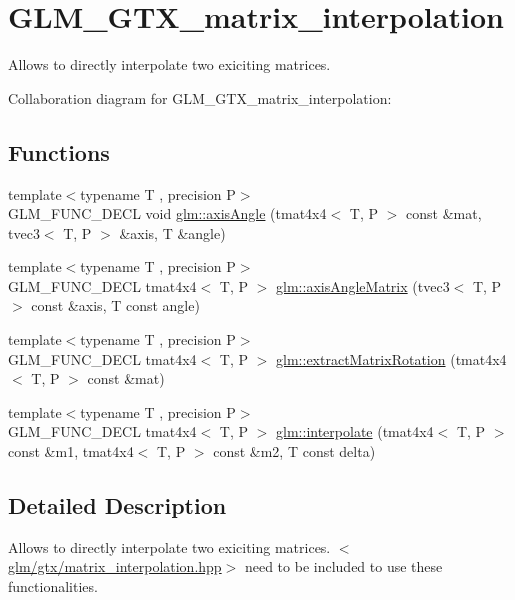 \hypertarget{group__gtx__matrix__interpolation}{\section{G\-L\-M\-\_\-\-G\-T\-X\-\_\-matrix\-\_\-interpolation}
\label{group__gtx__matrix__interpolation}
}


Allows to directly interpolate two exiciting matrices.  


Collaboration diagram for G\-L\-M\-\_\-\-G\-T\-X\-\_\-matrix\-\_\-interpolation\-:
\subsection*{Functions}
\begin{DoxyCompactItemize}
\item 
{\footnotesize template$<$typename T , precision P$>$ }\\G\-L\-M\-\_\-\-F\-U\-N\-C\-\_\-\-D\-E\-C\-L void \hyperlink{group__gtx__matrix__interpolation_ga9aef292eb5f29bdbb58a53ef4281af92}{glm\-::axis\-Angle} (tmat4x4$<$ T, P $>$ const \&mat, tvec3$<$ T, P $>$ \&axis, T \&angle)
\item 
{\footnotesize template$<$typename T , precision P$>$ }\\G\-L\-M\-\_\-\-F\-U\-N\-C\-\_\-\-D\-E\-C\-L tmat4x4$<$ T, P $>$ \hyperlink{group__gtx__matrix__interpolation_ga82d4bc058e9628cb2ea1d4e117a0cf39}{glm\-::axis\-Angle\-Matrix} (tvec3$<$ T, P $>$ const \&axis, T const angle)
\item 
{\footnotesize template$<$typename T , precision P$>$ }\\G\-L\-M\-\_\-\-F\-U\-N\-C\-\_\-\-D\-E\-C\-L tmat4x4$<$ T, P $>$ \hyperlink{group__gtx__matrix__interpolation_ga6b8170aa4cf43caf81400696ebb38afe}{glm\-::extract\-Matrix\-Rotation} (tmat4x4$<$ T, P $>$ const \&mat)
\item 
{\footnotesize template$<$typename T , precision P$>$ }\\G\-L\-M\-\_\-\-F\-U\-N\-C\-\_\-\-D\-E\-C\-L tmat4x4$<$ T, P $>$ \hyperlink{group__gtx__matrix__interpolation_ga45099a92c5c704503565619ac2bcd5c6}{glm\-::interpolate} (tmat4x4$<$ T, P $>$ const \&m1, tmat4x4$<$ T, P $>$ const \&m2, T const delta)
\end{DoxyCompactItemize}


\subsection{Detailed Description}
Allows to directly interpolate two exiciting matrices. $<$\hyperlink{matrix__interpolation_8hpp}{glm/gtx/matrix\-\_\-interpolation.\-hpp}$>$ need to be included to use these functionalities. 

